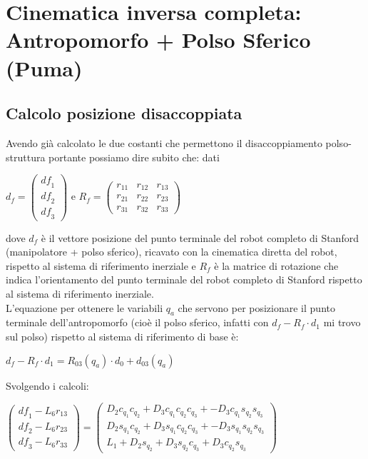 \documentclass[a4paper,12pt]{article}
\begin{document}
\newpage

\section{Cinematica inversa completa: Antropomorfo + Polso Sferico (Puma)}
\subsection{Calcolo posizione disaccoppiata}
Avendo già calcolato le due costanti che permettono il disaccoppiamento polso-struttura portante possiamo dire subito che: dati

\begin{center}
$d_f=\begin{pmatrix}{{\mathit{df}}_1}\\
{{\mathit{df}}_2}\\
{{\mathit{df}}_3}\end{pmatrix}$ e $R_f=\begin{pmatrix}{r_{11}} & {r_{12}} & {r_{13}}\\
{r_{21}} & {r_{22}} & {r_{23}}\\
{r_{31}} & {r_{32}} & {r_{33}}\end{pmatrix}$
\end{center}

\begin{flushleft}
dove $d_f$ è il vettore posizione del punto terminale del robot completo di Stanford (manipolatore + polso sferico), ricavato con la cinematica diretta del robot, rispetto al sistema di riferimento inerziale e $R_f$ è la matrice di rotazione che indica l'orientamento del punto terminale del robot completo di Stanford rispetto al sistema di riferimento inerziale. \\
L'equazione per ottenere le variabili $q_a$ che servono per posizionare il punto terminale dell'antropomorfo (cioè il polso sferico, infatti con $d_f- R_f \cdot d_1$ mi trovo sul polso) rispetto al sistema di riferimento di base è:
\end{flushleft}

\begin{center}
$d_f- R_f \cdot d_1 = R_{03}(q_a) \cdot d_0 + d_{03}(q_a)$ 
\end{center}

Svolgendo i calcoli:

\begin{center}
$\begin{pmatrix}{{\mathit{df}}_1}-{L_6} {r_{13}}\\
{{\mathit{df}}_2}-{L_6} {r_{23}}\\
{{\mathit{df}}_3}-{L_6} {r_{33}}\end{pmatrix}=\begin{pmatrix}{D_2} {c_{{q_1}}} {c_{{q_2}}}+{D_3} {c_{{q_1}}} {c_{{q_2}}} {c_{{q_3}}}+-{D_3} {c_{{q_1}}} {s_{{q_2}}} {s_{{q_3}}}\\
{D_2} {s_{{q_1}}} {c_{{q_2}}}+{D_3} {s_{{q_1}}} {c_{{q_2}}} {c_{{q_3}}}+-{D_3} {s_{{q_1}}} {s_{{q_2}}} {s_{{q_3}}}\\
{L_1}+{D_2} {s_{{q_2}}}+{D_3} {s_{{q_2}}} {c_{{q_3}}}+{D_3} {c_{{q_2}}} {s_{{q_3}}}\end{pmatrix}$
\end{center}
\end{document}
